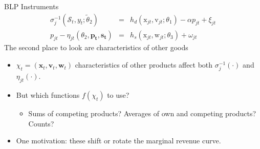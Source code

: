\documentclass[xcolor=pdftex,dvipsnames,table,mathserif,aspectratio=169]{beamer}
\begin{document}
\begin{frame}{BLP Instruments}
\begin{eqnarray*}
    \sigma_j^{-1}(\mathcal{S}_t,y_t;\widetilde{\theta}_2) &=&  h_d\left(\mathrm{x}_{jt}, \mathrm{v}_{jt}; \theta_1 \right)  - \alpha p_{jt} + \xi_{jt}\\
    p_{jt} - \eta_{jt}(\theta_2,\mathbf{p_t},\mathbf{s_t}) &=&   h_s\left(\mathrm{x}_{jt},\mathrm{w}_{jt};\theta_3 \right)+\omega_{jt}
\end{eqnarray*}
The second place to look are characteristics of other goods
\begin{itemize}
\item $\chi_t = (\mathbf{x}_{t},\mathbf{v}_{t},\mathbf{w}_{t})$ characteristics of other products affect both $\sigma_{j}^{-1}(\cdot)$ and $\eta_{jt}(\cdot)$.
\item But which functions $f(\chi_t)$ to use?
\begin{itemize}
\item Sums of competing products? Averages of own and competing products? Counts?
\end{itemize}
\item One motivation: these shift or rotate the \alert{marginal revenue curve}.
\end{itemize}
\end{frame}



\end{document}

